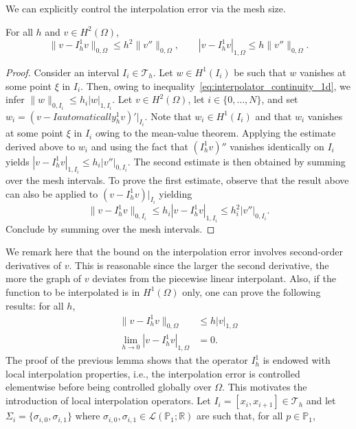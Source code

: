 We can explicitly control the interpolation error via the mesh size.
\begin{lemma}
    For all $h$ and $v \in H^2(\Omega)$,
    \begin{equation*}
\|v - I_h^1 v\|_{0,\Omega} \le h^2 \|v''\|_{0,\Omega},\qquad  |v - I_h^1 v|_{1,\Omega} \le h \|v''\|_{0,\Omega}.
\end{equation*}
\begin{proof}

    Consider an interval $I_i \in \mathcal{T}_h$. Let $w \in H^1(I_i)$ be such that $w$ vanishes at some point $\xi$ in $I_i$. Then, owing to inequality~\ref{eq:interpolator_continuity_1d}, we infer $\|w\|_{0,I_i} \le h_i |w|_{1,I_i}$.
    Let $v \in H^2(\Omega)$, let $i \in \{0, \dots, N\}$, and set $w_i = (v - Iautomatically_h^1 v)'|_{I_i}$. Note that $w_i \in H^1(I_i)$ and that $w_i$ vanishes at some point $\xi$ in $I_i$ owing to the mean-value theorem. Applying the estimate derived above to $w_i$ and using the fact that $(I_h^1 v)''$ vanishes identically on $I_i$ yields $|v - I_h^1 v|_{1,I_i} \le h_i |v''|_{0,I_i}$. The second estimate is then obtained by summing over the mesh intervals. To prove the first estimate, observe that the result above can also be applied to $(v - I_h^1 v)|_{I_i}$ yielding
    \begin{equation*}
\|v - I_h^1 v\|_{0,I_i} \le h_i |v - I_h^1 v|_{1,I_i} \le h_i^2 |v''|_{0,I_i}.
\end{equation*}
    Conclude by summing over the mesh intervals.
\end{proof}
\end{lemma}
We remark here that the bound on the interpolation error involves second-order derivatives of $v$. This is reasonable since the larger the second derivative, the more the graph of $v$ deviates from the piecewise linear interpolant. Also, if the function to be interpolated is in $H^1(\Omega)$ only, one can prove the following results: for all $h$,
\begin{align*}
    \|v - I_h^1 v\|_{0,\Omega} &\le h |v|_{1,\Omega}\\
    \lim_{h \rightarrow 0} |v - I_h^1 v|_{1,\Omega} &= 0.
\end{align*}
The proof of the previous lemma shows that the operator $I_h^1$ is endowed with local interpolation properties, i.e., the interpolation error is controlled elementwise before being controlled globally over $\Omega$. This motivates the introduction of local interpolation operators. Let $I_i = [x_i, x_{i+1}] \in \mathcal{T}_h$ and let $\Sigma_i = \{\sigma_{i,0}, \sigma_{i,1}\}$ where $\sigma_{i,0}, \sigma_{i,1} \in \mathcal{L}(\mathbb{P}_1; \mathbb{R})$ are such that, for all $p \in \mathbb{P}_1$,
